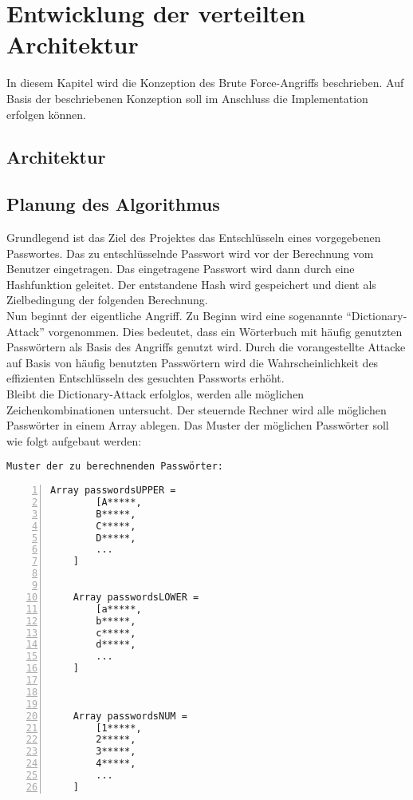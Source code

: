 \chapter{Entwicklung der verteilten Architektur}
\label{vorueberlegungen}
In diesem Kapitel wird die Konzeption des Brute Force-Angriffs beschrieben. Auf Basis der beschriebenen Konzeption soll im Anschluss die Implementation erfolgen können. 



\section{Architektur}


\section{Planung des Algorithmus}
\label{ideeBruteForce}
Grundlegend ist das Ziel des Projektes das Entschlüsseln eines vorgegebenen Passwortes. Das zu entschlüsselnde Passwort wird vor der Berechnung vom Benutzer eingetragen. Das eingetragene Passwort wird dann durch eine Hashfunktion geleitet. Der entstandene Hash wird gespeichert und dient als Zielbedingung der folgenden Berechnung. \\
Nun beginnt der eigentliche Angriff. Zu Beginn wird eine sogenannte \enquote{Dictionary-Attack} vorgenommen. Dies bedeutet, dass ein Wörterbuch mit häufig genutzten Passwörtern als Basis des Angriffs genutzt wird. Durch die vorangestellte Attacke auf Basis von häufig benutzten Passwörtern wird die Wahrscheinlichkeit des effizienten Entschlüsseln des gesuchten Passworts erhöht. \\
Bleibt die Dictionary-Attack erfolglos, werden alle möglichen Zeichenkombinationen untersucht. Der steuernde Rechner wird alle möglichen Passwörter in einem Array ablegen. Das Muster der möglichen Passwörter soll wie folgt aufgebaut werden: 

\texttt{Muster der zu berechnenden Passwörter:}
\begin{lstlisting}[basicstyle=\ttfamily,numbers=left,numberstyle=\footnotesize\ttfamily,backgroundcolor=\color{sourcegray}]
	Array passwordsUPPER = 
		[A*****,
	 	B*****,
	 	C*****,
	 	D*****,
	 	...
	]
	
	
	Array passwordsLOWER = 
		[a*****,
	 	b*****,
	 	c*****,
	 	d*****,
		...
	]
	
	

	Array passwordsNUM = 
		[1*****,
	 	2*****,
	 	3*****,
	 	4*****,
		...
	]
\end{lstlisting}

